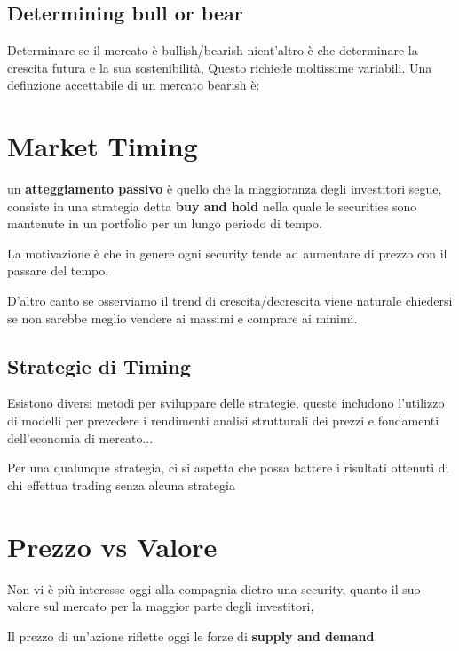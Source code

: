 \documentclass[a4paper,11pt]{report}
\begin{document}
{\subsection{Determining bull or bear}
	Determinare se il mercato è bullish/bearish nient'altro è che determinare la crescita futura e la sua sostenibilità, \newline
	Questo richiede moltissime variabili. \newline
	Una definzione accettabile di un mercato bearish è: 

\emph{}

\section{Market Timing}
	un \textbf{atteggiamento passivo} è quello che la maggioranza degli investitori segue, consiste in una strategia detta 				\textbf{buy and hold} nella quale le securities sono mantenute in un portfolio per un lungo periodo di tempo.

	La motivazione è che in genere ogni security tende ad aumentare di prezzo con il passare del tempo.

	D'altro canto se osserviamo il trend di crescita/decrescita viene naturale chiedersi se non sarebbe meglio vendere ai massimi e 	comprare ai minimi.
\subsection{Strategie di Timing}
	Esistono diversi metodi per sviluppare delle strategie, queste includono l'utilizzo di modelli per prevedere i rendimenti %
	analisi strutturali dei prezzi e fondamenti dell'economia di mercato...

	Per una qualunque strategia, ci si aspetta che possa battere i risultati ottenuti di chi effettua trading senza alcuna strategia
\section{Prezzo vs Valore}
	Non vi è più interesse oggi alla compagnia dietro una security, quanto il suo valore sul mercato per la maggior parte degli 		 	investitori,

	Il prezzo di un'azione riflette oggi le forze di \textbf{supply and demand}
}
\end{document}
